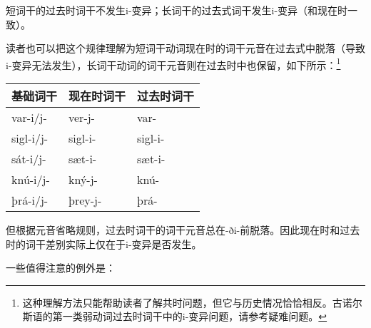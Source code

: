 \begin{info}
    短词干的过去时词干不发生i-变异；长词干的过去式词干发生i-变异（和现在时一致）。
\end{info}

读者也可以把这个规律理解为短词干动词现在时的词干元音在过去式中脱落（导致i-变异无法发生），长词干动词的词干元音则在过去时中也保留，如下所示：\footnote{这种理解方法只能帮助读者了解共时问题，但它与历史情况恰恰相反。古诺尔斯语的第一类弱动词过去时词干中的i-变异问题，请参考疑难问题。}

\begin{longtable}{lll}
    \toprule
    基础词干  & 现在时词干 & 过去时词干 \\
    \midrule
    \endhead
    \bottomrule
    \endfoot
    var-i/j-  & ver-j-     & var-       \\
    sigl-i/j- & sigl-i-    & sigl-i-    \\
    sát-i/j-  & sæt-i-     & sæt-i-     \\
    knú-i/j-  & kný-j-     & knú-       \\
    þrá-i/j-  & þrey-j-    & þrá-       \\
\end{longtable}

但根据元音省略规则，过去时词干的词干元音总在-ði-前脱落。因此现在时和过去时的词干差别实际上仅在于i-变异是否发生。

一些值得注意的例外是：


